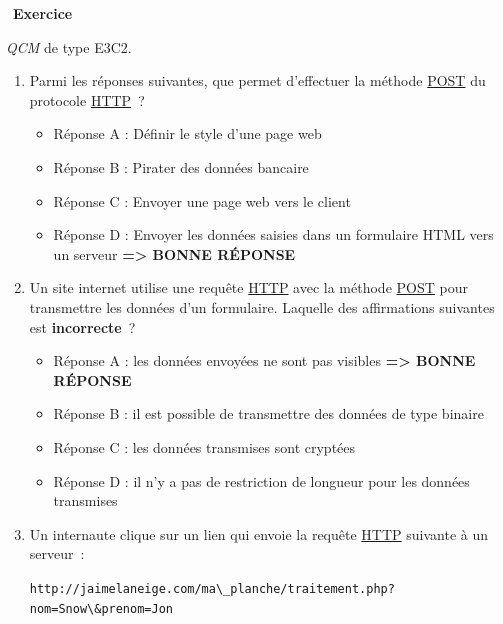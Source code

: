 \documentclass[
  11pt,
]{article}
\newcommand{\passthrough}[1]{#1}
\providecommand{\tightlist}{%
  \setlength{\itemsep}{0pt}\setlength{\parskip}{0pt}}
\newcounter{exo}
\newenvironment{exercice}[1]
{\par \medskip   \addtocounter{exo}{1} \noindent  
\begin{bclogo}[arrondi =0.1,   noborder = true, logo=\bccrayon, marge=4]{~\textbf{Exercice} \textbf{\theexo} {\itshape #1} }  \par}
{
\end{bclogo}
 \par \bigskip }
\newcounter{def}
\begin{document}
\begin{exercice}{}

\emph{QCM} de type E3C2.

\begin{enumerate}
\def\labelenumi{\arabic{enumi}.}
\item
  Parmi les réponses suivantes, que permet d'effectuer la méthode
  \href{https://developer.mozilla.org/fr/docs/Web/HTTP/M\%C3\%A9thode/POST}{POST}
  du protocole
  \href{https://developer.mozilla.org/fr/docs/Glossaire/HTTP}{HTTP}~?

  \begin{itemize}
  \tightlist
  \item
    Réponse A : Définir le style d'une page web
  \item
    Réponse B : Pirater des données bancaire\\
  \item
    Réponse C : Envoyer une page web vers le client\\
  \item
    Réponse D : Envoyer les données saisies dans un formulaire HTML vers
    un serveur \textbf{=\textgreater{} BONNE RÉPONSE}
  \end{itemize}
\item
  Un site internet utilise une requête
  \href{https://developer.mozilla.org/fr/docs/Glossaire/HTTP}{HTTP} avec
  la méthode
  \href{https://developer.mozilla.org/fr/docs/Web/HTTP/M\%C3\%A9thode/POST}{POST}
  pour transmettre les données d'un formulaire. Laquelle des
  affirmations suivantes est \textbf{incorrecte}~?

  \begin{itemize}
  \tightlist
  \item
    Réponse A : les données envoyées ne sont pas visibles
    \textbf{=\textgreater{} BONNE RÉPONSE}
  \item
    Réponse B : il est possible de transmettre des données de type
    binaire
  \item
    Réponse C : les données transmises sont cryptées
  \item
    Réponse D : il n'y a pas de restriction de longueur pour les données
    transmises
  \end{itemize}
\item
  Un internaute clique sur un lien qui envoie la requête
  \href{https://developer.mozilla.org/fr/docs/Glossaire/HTTP}{HTTP}
  suivante à un serveur~:

  \passthrough{\lstinline!http://jaimelaneige.com/ma\_planche/traitement.php?nom=Snow\&prenom=Jon!}


\end{enumerate}
\end{exercice}
\end{document}
